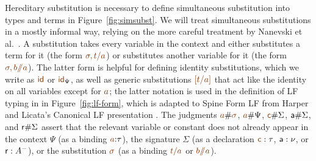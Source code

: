 Hereditary substitution is necessary to define simultaneous
substitution into types and terms in Figure~\ref{fig:simsubst}.  We
will treat simultaneous substitutions in a mostly informal way,
relying on the more careful treatment by Nanevski et
al.~\cite{nanevski08contextual}. A substitution takes every variable
in the context and either substitutes a term for it (the form
$\lf{\sigma,t/a}$) or substitutes another variable for it (the form
$\lf{\sigma,b/\!\!/a}$). The latter form is helpful for defining
identity substitutions, which we write as $\lf{\sf id}$ or $\lf{\sf
  id}_\Psi$, as well as generic substitutions $\lf{[t/a]}$ that act
like the identity on all variables except for $\lf{a}$; the latter
notation is used in the definition of LF typing in in
Figure~\ref{fig:lf-form}, which is adapted to Spine Form LF from
Harper and Licata's Canonical LF presentation
\cite{harper07mechanizing}. The judgments $\lf{a}\#\lf{\sigma}$,
$\lf{a}\#\Psi$, $\lf{\sf c}\#\Sigma$, ${\sf a}\#\Sigma$, and ${\sf
  r}\#\Sigma$ assert that the relevant variable or constant does not
already appear in the context $\Psi$ (as a binding $\lf{a}{:}\tau$),
the signature $\Sigma$ (as a declaration $\lf{\sf c} : \tau$, ${\sf a}
: \nu$, or ${\sf r} : A^-$), or the substitution $\lf{\sigma}$ (as a
binding $\lf{t/a}$ or \mbox{$\lf{b/\!\!/a}$}).

